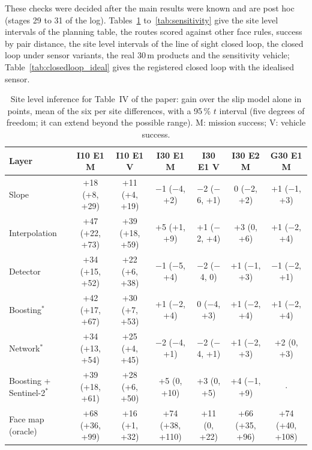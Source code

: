 \documentclass[10pt]{article}
\begin{document}
These checks were decided after the main results were known and are post hoc (stages 29 to 31 of the log). Tables~\ref{tab:sitelevel} to~\ref{tab:sensitivity} give the site level intervals of the planning table, the routes scored against other face rules, success by pair distance, the site level intervals of the line of sight closed loop, the closed loop under sensor variants, the real 30\,m products and the sensitivity vehicle; Table~\ref{tab:closedloop_ideal} gives the registered closed loop with the idealised sensor.

\begin{table}[H]
\caption{Site level inference for Table~IV of the paper: gain over the slip model alone in points, mean of the six per site differences, with a 95\,\% $t$ interval (five degrees of freedom; it can extend beyond the possible range). M: mission success; V: vehicle success.}
\label{tab:sitelevel}
\centering\scriptsize
\setlength{\tabcolsep}{3pt}
\begin{tabular}{@{}lcccccc@{}}
\toprule
Layer & I10 E1 M & I10 E1 V & I30 E1 M & I30 E1 V & I30 E2 M & G30 E1 M \\
\midrule
Slope & +18 (+8, +29) & +11 (+4, +19) & $-$1 ($-$4, +2) & $-$2 ($-$6, +1) & 0 ($-$2, +2) & +1 ($-$1, +3) \\
Interpolation & +47 (+22, +73) & +39 (+18, +59) & +5 (+1, +9) & +1 ($-$2, +4) & +3 (0, +6) & +1 ($-$2, +4) \\
Detector & +34 (+15, +52) & +22 (+6, +38) & $-$1 ($-$5, +4) & $-$2 ($-$4, 0) & +1 ($-$1, +3) & $-$1 ($-$2, +1) \\
Boosting$^{*}$ & +42 (+17, +67) & +30 (+7, +53) & +1 ($-$2, +4) & 0 ($-$4, +3) & +1 ($-$2, +4) & +1 ($-$2, +4) \\
Network$^{*}$ & +34 (+13, +54) & +25 (+4, +45) & $-$2 ($-$4, +1) & $-$2 ($-$4, +1) & +1 ($-$2, +3) & +2 (0, +3) \\
Boosting + Sentinel-2$^{*}$ & +39 (+18, +61) & +28 (+6, +50) & +5 (0, +10) & +3 (0, +5) & +4 ($-$1, +9) & $\cdot$ \\
Face map (oracle) & +68 (+36, +99) & +16 (+1, +32) & +74 (+38, +110) & +11 (0, +22) & +66 (+35, +96) & +74 (+40, +108) \\
\bottomrule
\end{tabular}
\end{table}
\end{document}
